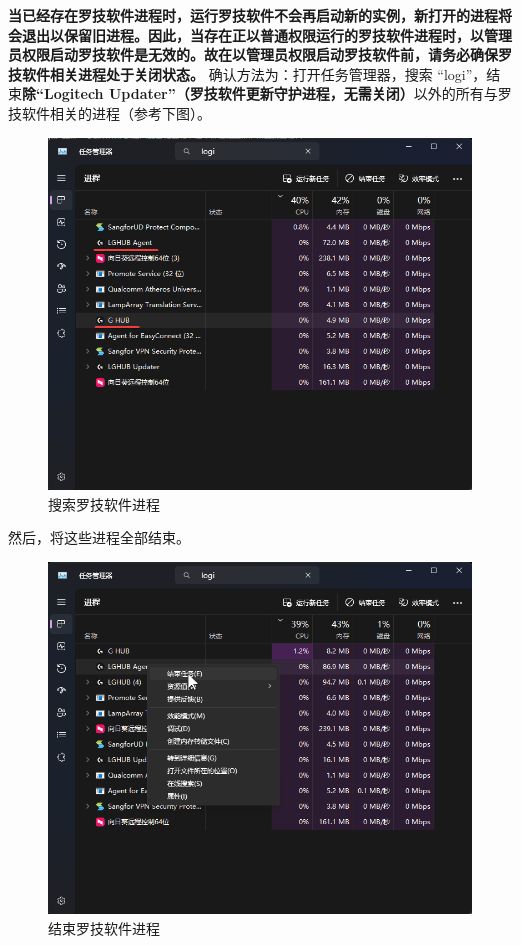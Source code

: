 \textbf{\color{red}当已经存在罗技软件进程时，运行罗技软件不会再启动新的实例，新打开的进程将会退出以保留旧进程。因此，当存在正以普通权限运行的罗技软件进程时，以管理员权限启动罗技软件是无效的。故在以管理员权限启动罗技软件前，请务必确保罗技软件相关进程处于关闭状态。}
确认方法为：打开任务管理器，搜索 “logi”，结束\textbf{\color{red}除“Logitech Updater”（罗技软件更新守护进程，无需关闭）}以外的所有与罗技软件相关的进程（参考下图）。

\begin{figure}[H]
    \Centering
    \includegraphics[width=\textwidth]{docs/assets/search_lghub_process.png}
    \caption{搜索罗技软件进程}
\end{figure}

然后，将这些进程全部结束。

\begin{figure}[H]
    \Centering
    \includegraphics[width=\textwidth]{docs/assets/terminate_lghub_00.png}
    \caption{结束罗技软件进程}
\end{figure}

